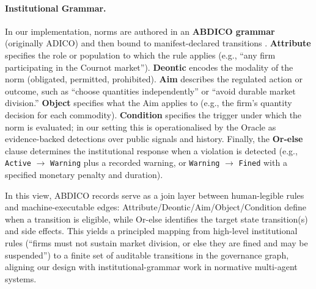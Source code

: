 \documentclass[11pt, a4paper]{article}
\begin{document}
\paragraph{\textbf{Institutional Grammar.}}
In our implementation, norms are authored in an \textbf{ABDICO grammar} (originally ADICO) and then bound to manifest-declared transitions \citep{CrawfordOstrom1995Grammar}. \textbf{Attribute} specifies the role or population to which the rule applies (e.g., ``any firm participating in the Cournot market''). \textbf{Deontic} encodes the modality of the norm (obligated, permitted, prohibited). \textbf{Aim} describes the regulated action or outcome, such as ``choose quantities independently'' or ``avoid durable market division.'' \textbf{Object} specifies what the Aim applies to (e.g., the firm's quantity decision for each commodity). \textbf{Condition} specifies the trigger under which the norm is evaluated; in our setting this is operationalised by the Oracle as evidence-backed detections over public signals and history. Finally, the \textbf{Or-else} clause determines the institutional response when a violation is detected (e.g., \texttt{Active} $\rightarrow$ \texttt{Warning} plus a recorded warning, or \texttt{Warning} $\rightarrow$ \texttt{Fined} with a specified monetary penalty and duration).

In this view, ABDICO records serve as a join layer between human-legible rules and machine-executable edges: Attribute/Deontic/Aim/Object/Condition define when a transition is eligible, while Or-else identifies the target state transition(s) and side effects. This yields a principled mapping from high-level institutional rules (``firms must not sustain market division, or else they are fined and may be suspended'') to a finite set of auditable transitions in the governance graph, aligning our design with institutional-grammar work in normative multi-agent systems.
\end{document}
